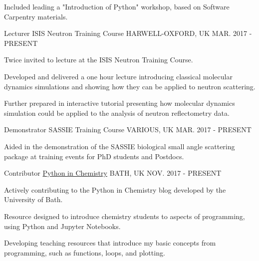 \begin{cventries}
{\begin{cvitems}
			\item {Included leading a "Introduction of Python" workshop, based on Software Carpentry materials. }
		\end{cvitems}
	}
	\cventry
	{Lecturer}
	{ISIS Neutron Training Course}
	{HARWELL-OXFORD, UK}
	{MAR. 2017 - PRESENT}
	{
		\begin{cvitems}
			\item {Twice invited to lecture at the ISIS Neutron Training Course.}
			\item {Developed and delivered a one hour lecture introducing classical molecular dynamics simulations and showing how they can be applied to neutron scattering.}
			\item {Further prepared in interactive tutorial presenting how molecular dynamics simulation could be applied to the analysis of neutron reflectometry data.}
		\end{cvitems}
	}
	\cventry
	{Demonstrator}
	{SASSIE Training Course}
	{VARIOUS, UK}
	{MAR. 2017 - PRESENT}
	{
		\begin{cvitems}
			\item {Aided in the demonstration of the SASSIE biological small angle scattering package at training events for PhD students and Postdocs.}
		\end{cvitems}
	}
	\cventry
	{Contributor}
	{\href{http://blogs.bath.ac.uk/python/}{Python in Chemistry}}
	{BATH, UK}
	{NOV. 2017 - PRESENT}
	{
		\begin{cvitems}
			\item {Actively contributing to the Python in Chemistry blog developed by the University of Bath.}
			\item {Resource designed to introduce chemistry students to aspects of programming, using Python and Jupyter Notebooks.}
			\item {Developing teaching resources that introduce my basic concepts from programming, such as functions, loops, and plotting.}
		\end{cvitems}
	}
\end{cventries}
